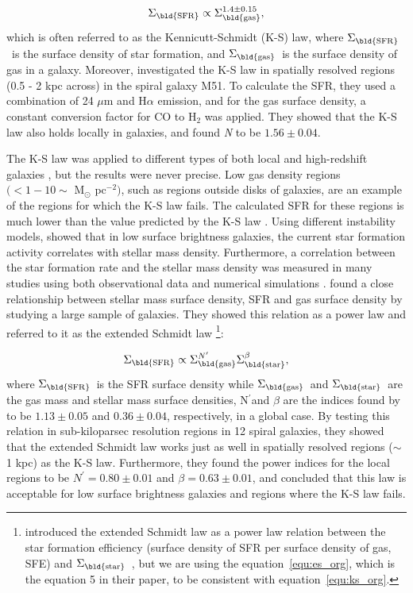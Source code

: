 \documentclass[useAMS,usenatbib]{mn2e}
\newcommand \sigmagas    {$\Sigma_{\rm \bld {gas }} $\ }
\newcommand \eqsigmagas    {\Sigma_{\rm \bld {gas }}}
\newcommand \sigmasfr     {$\Sigma_{\rm \bld {SFR }} $\ }
\newcommand \eqsigmasfr     {\Sigma_{\rm \bld {SFR }}}
\newcommand \sigmastar    {$\Sigma_{\rm \bld {star }} $\ }
\newcommand \eqsigmastar    {\Sigma_{\rm \bld {star }}}
\newcommand \nprime {N$^\prime$}
\newcommand \eqnprime {N^\prime}
\begin{document}
\begin{equation}
\label{equ:ks_org}
\eqsigmasfr \propto \eqsigmagas^{1.4\pm0.15},
\end{equation}
\noindent which is often referred to as the Kennicutt-Schmidt (K-S) law, where \sigmasfr is the surface density of star formation, and \sigmagas is the surface density of gas in a galaxy. Moreover, \cite{Kennicutt07} investigated the K-S law in spatially resolved regions (0.5 - 2 kpc across) in the spiral galaxy M51. To calculate the SFR, they used a combination of 24 $\mu$m and H${\alpha}$ emission, and for the gas surface density, a constant conversion factor for CO to H$_2$ was applied. They showed that the K-S law also holds locally in galaxies, and found {\it N} to be $1.56 \pm 0.04$. %

The K-S law was applied to different types of both local and high-redshift galaxies \citep[e.g.][]{Boissier07,Kennicutt07, Bigiel08, Freundlich13}, but the results were never precise. Low gas density regions $( < 1-10\sim$ M$_{\odot}$ pc$^{-2})$, such as regions outside disks of galaxies, are an example of the regions for which the K-S law fails. The calculated SFR for these regions is much lower than the value predicted by the K-S law \citep[e.g.][]{Martin01, Bigiel08}. Using different instability models, \cite{Hunter98} showed that in low surface brightness galaxies, the current star formation activity correlates with stellar mass density. Furthermore, a correlation between the star formation rate and the stellar mass density was measured in many studies using both observational data and numerical simulations \citep[e.g.][]{Hunter04,Leroy08,Krumholz09,Shi11,Kim11,Kim13}. \cite{Shi11} found a close relationship between stellar mass surface density, SFR and gas surface density by studying a large sample of galaxies. They showed this relation as a power law and referred to it as the extended Schmidt law \footnote{\cite{Shi11} introduced the extended Schmidt law as a power law relation between the star formation efficiency (surface density of SFR per surface density of gas, SFE) and \sigmastar, but we are using the equation~\ref{equ:es_org}, which is the equation 5 in their paper, to be consistent with equation~\ref{equ:ks_org}.}: %

\begin{equation}
\label{equ:es_org}
\eqsigmasfr \propto \eqsigmagas^{\eqnprime} \eqsigmastar^{\beta},
\end{equation}
\noindent where \sigmasfr is the SFR surface density while \sigmagas and \sigmastar are the gas mass and stellar mass surface densities, \nprime and $\beta$ are the indices found by \cite{Shi11} to be $1.13 \pm 0.05$ and $0.36\pm0.04$, respectively, in a global case. By testing this relation in sub-kiloparsec resolution regions in 12 spiral galaxies, they showed that the extended Schmidt law works just as well in spatially resolved regions ($\sim$1 kpc) as the K-S law. Furthermore, they found the power indices for the local regions to be $\eqnprime = 0.80 \pm 0.01$ and $\beta = 0.63\pm0.01$, and concluded that this law is acceptable for low surface brightness galaxies and regions where the K-S law fails.%
\end{document}
